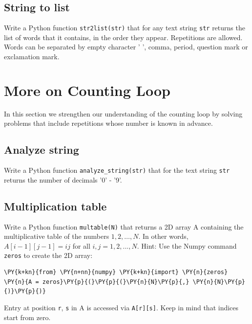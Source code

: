 
\subsection{String to list}

Write a Python function {\tt str2list(str)} that for any text string {\tt str} 
returns the list of words that it contains, in the order they appear. Repetitions 
are allowed. Words can be separated by empty character  ' ', comma, period, 
question mark or exclamation mark.


\section{More on Counting Loop} 

In this section we strengthen our understanding of the counting 
loop by solving problems that include repetitions whose number 
is known in advance.


\subsection{Analyze string}

Write a Python function {\tt analyze\_string(str)} that for the text string {\tt str}
returns the number of decimals '0' - '9'. 


\subsection{Multiplication table}

Write a Python function {\tt multable(N)} that returns a 2D array 
A containing the multiplicative table of the numbers $1, 2, \ldots, N$. 
In other words, $A[i-1][j-1] = ij$ for all $i, j = 1, 2, ..., N$. Hint: Use 
the Numpy command {\tt zeros} to create the 2D array:

\begin{Verbatim}[commandchars=\\\{\}]
\PY{k+kn}{from} \PY{n+nn}{numpy} \PY{k+kn}{import} \PY{n}{zeros}
\PY{n}{A = zeros}\PY{p}{(}\PY{p}{(}\PY{n}{N}\PY{p}{,} \PY{n}{N}\PY{p}{)}\PY{p}{)}
\end{Verbatim}
Entry at position {\tt r}, {\tt s} in A is accessed via {\tt A[r][s]}. Keep in mind that
indices start from zero. 
 
